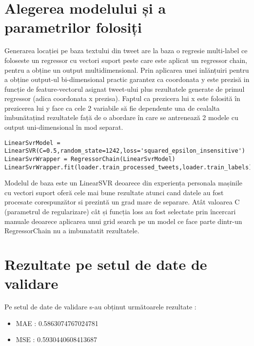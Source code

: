 \documentclass[a4paper,12pt]{article}
\begin{document}
\section{Alegerea modelului și a parametrilor folosiți}
Generarea locației pe baza textului din tweet are la baza  o regresie multi-label ce foloseste un regressor cu vectori suport peste care este aplicat un regressor chain, pentru a obține un output multidimensional. Prin aplicarea unei inlănțuiri pentru a obține output-ul bi-dimensional practic garantez ca coordonata y este prezisă in funcție de feature-vectorul asignat tweet-ului plus rezultatele generate de primul regressor (adica coordonata x prezisa). Faptul ca prezicera lui x este folosită în prezicerea lui y face ca cele 2 variabile să fie dependente una de cealalta îmbunătațind rezultatele față de o abordare în care se antrenează 2 modele cu output uni-dimensional în mod separat. 
\begin{verbatim}
LinearSvrModel = LinearSVR(C=0.5,random_state=1242,loss='squared_epsilon_insensitive')
LinearSvrWrapper = RegressorChain(LinearSvrModel)
LinearSvrWrapper.fit(loader.train_processed_tweets,loader.train_labels)
\end{verbatim}
\par Modelul de baza este un LinearSVR deoarece din experiența personala mașinile cu vectori suport oferă cele mai bune rezultate atunci cand datele au fost procesate corespunzător si prezintă un grad mare de separare.
Atât valoarea C (parametrul de regularizare) cât și funcția loss au fost selectate prin încercari manuale deoarece aplicarea unui grid search pe un model ce face parte dintr-un RegressorChain nu a imbunatatit rezultatele. 
\section{Rezultate pe setul de date de validare}
\par Pe setul de date  de validare s-au obținut următoarele rezultate :
\begin{itemize}
\item MAE : 0.5863074767024781
\item MSE : 0.5930440608413687
\end{itemize}
\end{document}
